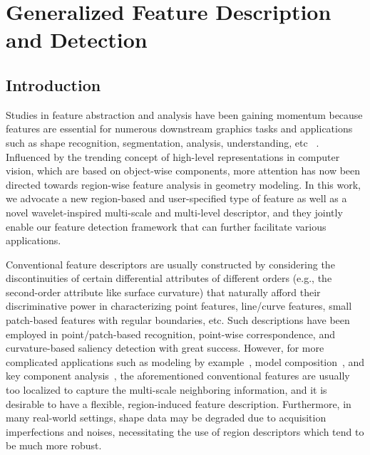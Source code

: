 \chapter{Generalized Feature Description and Detection}

\section{Introduction}

Studies in feature abstraction and analysis have been gaining momentum because 
features are essential for numerous downstream graphics tasks and applications 
such as shape recognition, segmentation, analysis, understanding, etc
~\cite{Bronstein2011,Kin-ChungAu:2012,Song:2014:MSV}. Influenced
by the trending concept of high-level representations in computer
vision, which are based on object-wise components, more
attention has now been directed towards region-wise feature analysis in
geometry modeling. In this work, we advocate a new region-based and
user-specified type of feature as well as a novel
wavelet-inspired multi-scale and multi-level descriptor, and they
jointly enable our feature detection framework that can further
facilitate various applications.

Conventional feature descriptors are usually constructed by considering
the discontinuities of certain differential attributes of different
orders (e.g., the second-order attribute like surface curvature) that
naturally afford their discriminative power in characterizing point
features, line/curve features, small patch-based features with regular
boundaries, etc. Such descriptions have been employed in point/patch-based
recognition, point-wise correspondence, and curvature-based saliency
detection with great success. However, for more complicated applications
such as modeling by example~\cite{Funkhouser:2004}, model
composition~\cite{Kreavoy:2007}, and key component
analysis~\cite{Sipiran:2012}, the aforementioned conventional features
are usually too localized to capture the multi-scale neighboring
information, and it is desirable to have a flexible, region-induced feature
description. Furthermore, in many real-world settings, shape data may be
degraded due to acquisition imperfections and noises, necessitating the
use of region descriptors which tend to be much more robust.

